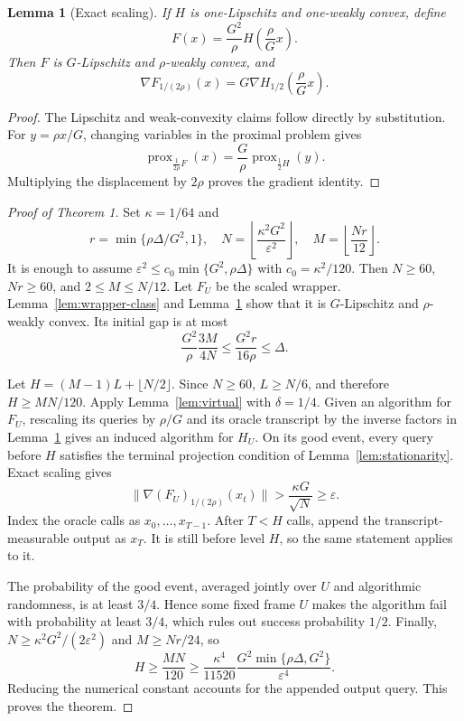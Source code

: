 \documentclass[twoside]{article}
\newtheorem{lemma}[theorem]{Lemma}
\newcommand{\ve}{\varepsilon}
\newcommand{\prox}{\operatorname{prox}}
\begin{document}
\begin{lemma}[Exact scaling]
\label{lem:scaling}
If $H$ is one-Lipschitz and one-weakly convex, define
\[
 F(x)=\frac{G^2}{\rho}H\left(\frac\rho Gx\right).
\]
Then $F$ is $G$-Lipschitz and $\rho$-weakly convex, and
\[
 \nabla F_{1/(2\rho)}(x)
 =G\nabla H_{1/2}\left(\frac\rho Gx\right).
\]
\end{lemma}

\begin{proof}
The Lipschitz and weak-convexity claims follow directly by substitution. For
$y=\rho x/G$, changing variables in the proximal problem gives
\[
 \prox_{\frac1{2\rho}F}(x)=\frac G\rho\prox_{\frac12H}(y).
\]
Multiplying the displacement by $2\rho$ proves the gradient identity.
\end{proof}

\begin{proof}[Proof of Theorem 1]
Set $\kappa=1/64$ and
\[
 r=\min\{\rho\Delta/G^2,1\},\quad
 N=\left\lfloor\frac{\kappa^2G^2}{\ve^2}\right\rfloor,
 \quad M=\left\lfloor\frac{Nr}{12}\right\rfloor.
\]
It is enough to assume
$\ve^2\leq c_0\min\{G^2,\rho\Delta\}$ with
$c_0=\kappa^2/120$. Then $N\geq60$, $Nr\geq60$, and
$2\leq M\leq N/12$. Let $F_U$ be the scaled wrapper.
Lemma~\ref{lem:wrapper-class} and Lemma~\ref{lem:scaling} show that it is
$G$-Lipschitz and $\rho$-weakly convex. Its initial gap is at most
\[
 \frac{G^2}{\rho}\frac{3M}{4N}
 \leq\frac{G^2r}{16\rho}\leq\Delta.
\]

Let $H=(M-1)L+\lfloor N/2\rfloor$. Since $N\geq60$,
$L\geq N/6$, and therefore $H\geq MN/120$. Apply
Lemma~\ref{lem:virtual} with $\delta=1/4$. Given an algorithm for $F_U$,
rescaling its queries by $\rho/G$ and its oracle transcript by the inverse
factors in Lemma~\ref{lem:scaling} gives an induced algorithm for $H_U$.
On its good event, every query before $H$ satisfies the terminal projection
condition of Lemma~\ref{lem:stationarity}. Exact scaling gives
\[
 \|\nabla(F_U)_{1/(2\rho)}(x_t)\|
 >\frac{\kappa G}{\sqrt N}\geq\ve.
\]
 Index the oracle calls as $x_0,\ldots,x_{T-1}$. After $T<H$ calls, append
 the transcript-measurable output as $x_T$. It is still before level $H$, so
 the same statement applies to it.

The probability of the good event, averaged jointly over $U$ and algorithmic
randomness, is at least $3/4$. Hence some fixed frame $U$ makes the algorithm
fail with probability at least $3/4$, which rules out success probability
$1/2$. Finally,
$N\geq\kappa^2G^2/(2\ve^2)$ and
$M\geq Nr/24$, so
\[
 H\geq\frac{MN}{120}
 \geq\frac{\kappa^4}{11520}
 \frac{G^2\min\{\rho\Delta,G^2\}}{\ve^4}.
\]
Reducing the numerical constant accounts for the appended output query. This
proves the theorem.
\end{proof}


\end{document}
